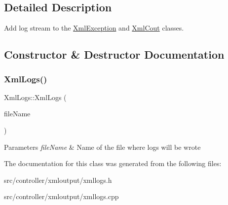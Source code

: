 \subsection{Detailed Description}
Add log stream to the \hyperlink{classXmlException}{Xml\+Exception} and \hyperlink{classXmlCout}{Xml\+Cout} classes. 

\subsection{Constructor \& Destructor Documentation}
\mbox{\label{classXmlLogs_a98546fca3a71b0e5c636bfbdac34e383}} 
\subsubsection{\texorpdfstring{Xml\+Logs()}{XmlLogs()}}
{\footnotesize\ttfamily Xml\+Logs\+::\+Xml\+Logs (\begin{DoxyParamCaption}\item[{const Q\+String \&}]{file\+Name }\end{DoxyParamCaption})}


\begin{DoxyParams}{Parameters}
{\em file\+Name} & Name of the file where logs will be wrote \\
\hline
\end{DoxyParams}


The documentation for this class was generated from the following files\+:\begin{DoxyCompactItemize}
\item 
src/controller/xmloutput/xmllogs.\+h\item 
src/controller/xmloutput/xmllogs.\+cpp\end{DoxyCompactItemize}
